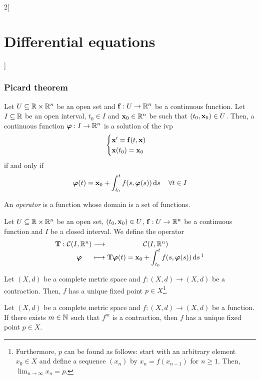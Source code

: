 \documentclass[../../../main_math.tex]{subfiles}
\begin{document}
\begin{multicols}{2}[\section{Differential equations}]
  \subsubsection{Picard theorem}
  \begin{proposition}
    Let $U\subseteq\mathbb{R}\times\mathbb{R}^n$ be an open set and $\boldsymbol{\mathrm{f}}:U\rightarrow\mathbb{R}^n$ be a continuous function. Let $I\subseteq\mathbb{R}$ be an open interval, $t_0\in I$ and $\boldsymbol{\mathrm{x}}_0\in\mathbb{R}^n$ be such that $(t_0,\boldsymbol{\mathrm{x}}_0)\in U$. Then, a continuous function $\boldsymbol{\mathrm{\varphi}}:I\rightarrow\mathbb{R}^n$ is a solution of the ivp
    \begin{equation}
      \begin{cases}
        \boldsymbol{\mathrm{x}}'=\boldsymbol{\mathrm{f}}(t,\boldsymbol{\mathrm{x}}) \\
        \boldsymbol{\mathrm{x}}(t_0)=\boldsymbol{\mathrm{x}}_0
      \end{cases}
      \label{DE_ivp}
    \end{equation}
    if and only if $$\boldsymbol{\mathrm{\varphi}}(t)=\boldsymbol{\mathrm{x}}_0+\int_{t_0}^tf(s,\boldsymbol{\mathrm{\varphi}}(s))\dd{s}\quad\forall t\in I$$
  \end{proposition}
  \begin{definition}
    An \emph{operator} is a function whose domain is a set of functions.
  \end{definition}
  \begin{definition}
    Let $U\subseteq\mathbb{R}\times\mathbb{R}^n$ be an open set, $(t_0,\boldsymbol{\mathrm{x}}_0)\in U$, $\boldsymbol{\mathrm{f}}:U\rightarrow\mathbb{R}^n$ be a continuous function and $I$ be a closed interval. We define the operator
    $$
      \function{\vf{T}}
      {\mathcal{C}(I,\RR^n)}
      {\mathcal{C}(I,\RR^n)}
      {\vf{\varphi}}
      {\displaystyle\vf{T}\vf{\varphi}(t)=\vf{x}_0+\int_{t_0}^tf(s,\vf{\varphi}(s))\dd{s}\footnotemark}
    $$
  \end{definition}
  \begin{theorem}
    Let $(X,d)$ be a complete metric space and $f:(X,d)\rightarrow (X,d)$ be a contraction. Then, $f$ has a unique fixed point $p\in X$\footnote{Furthermore, $p$ can be found as follows: start with an arbitrary element $x_0\in X$ and define a sequence $(x_n)$ by $x_n=f(x_{n-1})$ for $n\geq 1$. Then, $\displaystyle\lim_{n\to\infty} x_n=p$.}.
  \end{theorem}
  \begin{corollary}
    Let $(X,d)$ be a complete metric space and $f:(X,d)\rightarrow (X,d)$ be a function. If there exists $m\in\mathbb{N}$ such that $f^m$ is a contraction, then $f$ has a unique fixed point $p\in X$.

\end{corollary}
\end{multicols}
\end{document}
